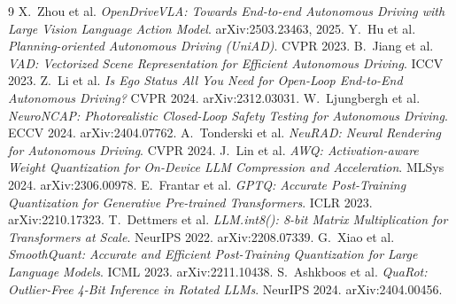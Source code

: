 \documentclass[conference]{IEEEtran}
\begin{document}
\begin{thebibliography}{9}
 X.\ Zhou et al. \emph{OpenDriveVLA: Towards End-to-end Autonomous
Driving with Large Vision Language Action Model}. arXiv:2503.23463, 2025.
 Y.\ Hu et al. \emph{Planning-oriented Autonomous Driving (UniAD)}. CVPR 2023.
 B.\ Jiang et al. \emph{VAD: Vectorized Scene Representation for Efficient
Autonomous Driving}. ICCV 2023.
 Z.\ Li et al. \emph{Is Ego Status All You Need for Open-Loop End-to-End
Autonomous Driving?} CVPR 2024. arXiv:2312.03031.
 W.\ Ljungbergh et al. \emph{NeuroNCAP: Photorealistic Closed-Loop Safety
Testing for Autonomous Driving}. ECCV 2024. arXiv:2404.07762.
 A.\ Tonderski et al. \emph{NeuRAD: Neural Rendering for Autonomous Driving}.
CVPR 2024.
 J.\ Lin et al. \emph{AWQ: Activation-aware Weight Quantization for On-Device
LLM Compression and Acceleration}. MLSys 2024. arXiv:2306.00978.
 E.\ Frantar et al. \emph{GPTQ: Accurate Post-Training Quantization for
Generative Pre-trained Transformers}. ICLR 2023. arXiv:2210.17323.
 T.\ Dettmers et al. \emph{LLM.int8(): 8-bit Matrix Multiplication for
Transformers at Scale}. NeurIPS 2022. arXiv:2208.07339.
 G.\ Xiao et al. \emph{SmoothQuant: Accurate and Efficient Post-Training
Quantization for Large Language Models}. ICML 2023. arXiv:2211.10438.
 S.\ Ashkboos et al. \emph{QuaRot: Outlier-Free 4-Bit Inference in Rotated
LLMs}. NeurIPS 2024. arXiv:2404.00456.
\end{thebibliography}
\end{document}
